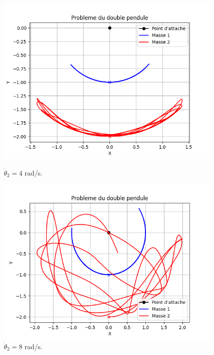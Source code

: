 \begin{figure} [H]
	\begin{minipage}[c]{0.4\textwidth}
		\centering
		\includegraphics[width=\textwidth]{res/no_retournement.png}
		\caption{$\dot \theta_2 = 4$ rad/s.}
		\label{fig:no_retournement}
	\end{minipage}\hfill
	\begin{minipage}[c]{0.4\textwidth}
		\centering
		\includegraphics[width=\textwidth]{res/retournement.png}
		\caption{$\dot \theta_2 = 8$ rad/s.}
		\label{fig:retournement}
	\end{minipage}
\end{figure}

